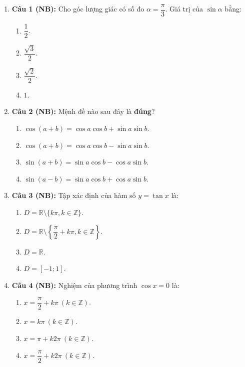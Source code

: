 \documentclass[12pt, a4paper]{article}
\begin{document}
\begin{enumerate}[leftmargin=0.8cm]
    \item \textbf{Câu 1 (NB):} Cho góc lượng giác có số đo $\alpha = \dfrac{\pi}{3}$. Giá trị của $\sin \alpha$ bằng:
    \begin{enumerate}[label=\Alph*., leftmargin=0.8cm]
        \item $\dfrac{1}{2}$.
        \item $\dfrac{\sqrt{3}}{2}$.
        \item $\dfrac{\sqrt{2}}{2}$.
        \item $1$.
    \end{enumerate}

    \item \textbf{Câu 2 (NB):} Mệnh đề nào sau đây là \textbf{đúng}?
    \begin{enumerate}[label=\Alph*., leftmargin=0.8cm]
        \item $\cos(a + b) = \cos a \cos b + \sin a \sin b$.
        \item $\cos(a + b) = \cos a \cos b - \sin a \sin b$.
        \item $\sin(a + b) = \sin a \cos b - \cos a \sin b$.
        \item $\sin(a - b) = \sin a \cos b + \cos a \sin b$.
    \end{enumerate}

    \item \textbf{Câu 3 (NB):} Tập xác định của hàm số $y = \tan x$ là:
    \begin{enumerate}[label=\Alph*., leftmargin=0.8cm]
        \item $D = \mathbb{R} \setminus \{k\pi, k \in \mathbb{Z}\}$.
        \item $D = \mathbb{R} \setminus \left\{\dfrac{\pi}{2} + k\pi, k \in \mathbb{Z}\right\}$.
        \item $D = \mathbb{R}$.
        \item $D = [-1; 1]$.
    \end{enumerate}

    \item \textbf{Câu 4 (NB):} Nghiệm của phương trình $\cos x = 0$ là:
    \begin{enumerate}[label=\Alph*., leftmargin=0.8cm]
        \item $x = \dfrac{\pi}{2} + k\pi \ (k \in \mathbb{Z})$.
        \item $x = k\pi \ (k \in \mathbb{Z})$.
        \item $x = \pi + k2\pi \ (k \in \mathbb{Z})$.
        \item $x = \dfrac{\pi}{2} + k2\pi \ (k \in \mathbb{Z})$.
    \end{enumerate}


\end{enumerate}
\end{document}
